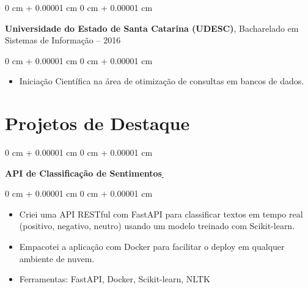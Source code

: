 \documentclass[10pt, letterpaper]{article}
\newenvironment{highlights}{
    \begin{itemize}[
        topsep=0.10 cm,
        parsep=0.10 cm,
        partopsep=0pt,
        itemsep=0pt,
        leftmargin=0 cm + 10pt
    ]
}{
    \end{itemize}
}
\newenvironment{onecolentry}{
    \begin{adjustwidth}{
        0 cm + 0.00001 cm
    }{
        0 cm + 0.00001 cm
    }
}{
    \end{adjustwidth}
}
\begin{document}
\vspace{0.2cm}

    \begin{onecolentry}
        \setcolumnwidth{\fill, 4.5cm}
        \begin{paracol}{2}
            \textbf{Universidade do Estado de Santa Catarina (UDESC)}, Bacharelado em Sistemas de Informação
            \switchcolumn
             – 2016
        \end{paracol}
    \end{onecolentry}
    \vspace{0.10cm}
    \begin{onecolentry}
        \begin{highlights}
                    \item Iniciação Científica na área de otimização de consultas em bancos de dados.
        \end{highlights}
    \end{onecolentry}
    
\section{Projetos de Destaque}

    \begin{onecolentry}
        \textbf{API de Classificação de Sentimentos}\href{https://github.com/leoschmidt/sentiment-api}{\, \faGithub}
    \end{onecolentry}
    \vspace{0.10cm}
    \begin{onecolentry}
        \begin{highlights}
                    \item Criei uma API RESTful com FastAPI para classificar textos em tempo real (positivo, negativo, neutro) usando um modelo treinado com Scikit-learn.
                \item Empacotei a aplicação com Docker para facilitar o deploy em qualquer ambiente de nuvem.
                \item Ferramentas: FastAPI, Docker, Scikit-learn, NLTK
        \end{highlights}
    \end{onecolentry}
    
\vspace{0.2cm}
\end{document}

